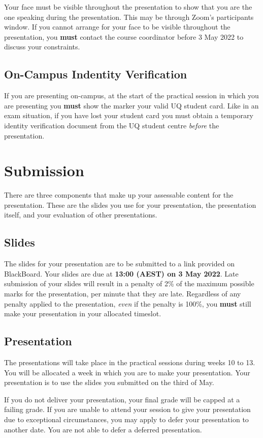 \documentclass{csse4400}
\begin{document}
Your face must be visible throughout the presentation to show that you are the one speaking during the presentation.
This may be through Zoom's participants window.
If you cannot arrange for your face to be visible throughout the presentation,
you \textbf{must} contact the course coordinator before 3 May 2022 to discuss your constraints.

\subsection{On-Campus Indentity Verification}
If you are presenting on-campus, at the start of the practical session in which you are presenting
you \textbf{must} show the marker your valid UQ student card.
Like in an exam situation, if you have lost your student card
you must obtain a temporary identity verification document from the UQ student centre \emph{before} the presentation.


\section{Submission}
There are three components that make up your assessable content for the presentation.
These are the slides you use for your presentation, the presentation itself, and your evaluation of other presentations.

\subsection{Slides}
The slides for your presentation are to be submitted to a link provided on BlackBoard.
Your slides are due at \textbf{13:00 (AEST) on 3 May 2022}.
Late submission of your slides will result in a penalty of 2\% of the maximum possible marks for the presentation, per minute that they are late.
Regardless of any penalty applied to the presentation, \emph{even} if the penalty is 100\%,
you \textbf{must} still make your presentation in your allocated timeslot.

\subsection{Presentation}
The presentations will take place in the practical sessions during weeks 10 to 13.
You will be allocated a week in which you are to make your presentation.
Your presentation is to use the slides you submitted on the third of May.

If you do not deliver your presentation, your final grade will be capped at a failing grade.
If you are unable to attend your session to give your presentation due to exceptional circumstances,
you may apply to defer your presentation to another date.
You are not able to defer a deferred presentation.
\end{document}
